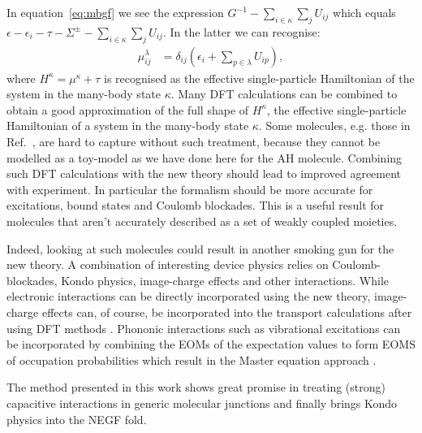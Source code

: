 \documentclass{article}
\begin{document}
\begin{multicols}{2}
    In equation~\ref{eq:mbgf} we see the expression $G^{-1} - \sum_{i\in\kappa}\sum_j U_{ij}$ which equals $\epsilon - \epsilon_i - \tau - \Sigma^\pm - \sum_{i\in\kappa}\sum_j U_{ij}$. In the latter we can recognise:
    \begin{align}
    \mu^\lambda_{ij} &= \delta_{ij} \left( \epsilon_i + \sum_{p\in\lambda} U_{ip} \right) \label{eq:result},
    \end{align} 
    where $H^\kappa = \mu^\kappa + \tau$ is recognised as the effective single-particle Hamiltonian of the system in the many-body state $\kappa$. Many DFT calculations can be combined to obtain a good approximation of the full shape of $H^\kappa$, the effective single-particle Hamiltonian of a system in the many-body state $\kappa$. Some molecules, e.g. those in Ref.~\cite{frisenda}, are hard to capture without such treatment, because they cannot be modelled as a toy-model as we have done here for the AH molecule. Combining such DFT calculations with the new theory should lead to improved agreement with experiment. In particular the formalism should be more accurate for excitations, bound states and Coulomb blockades. This is a useful result for molecules that aren't accurately described as a set of weakly coupled moieties.
    
    Indeed, looking at such molecules could result in another smoking gun for the new theory. A combination of interesting device physics relies on Coulomb-blockades, Kondo physics, image-charge effects and other interactions. While electronic interactions can be directly incorporated using the new theory, image-charge effects can, of course, be incorporated into the transport calculations after using DFT methods \cite{Perrin2013, verzijlgil}. Phononic interactions such as vibrational excitations \cite{vibrations} can be incorporated by combining the EOMs of the expectation values to form EOMS of occupation probabilities which result in the Master equation approach \cite{seldenthuisthesis}.
    
    The method presented in this work shows great promise in treating (strong) capacitive interactions in generic molecular junctions and finally brings Kondo physics into the NEGF fold. 
    
     
\end{multicols}
\end{document}
